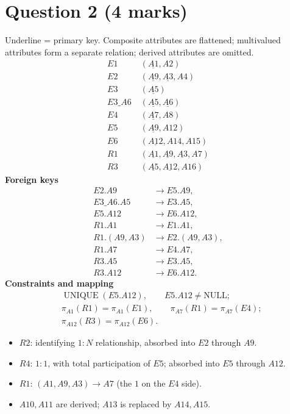 \documentclass[11pt,a4paper]{article}
\newcommand{\pk}[1]{\underline{\mathit{#1}}}
\begin{document}
\section*{Question 2 (4 marks)}
Underline = primary key. Composite attributes are flattened; multivalued
attributes form a separate relation; derived attributes are omitted.
\[
\boxed{\begin{aligned}
E1&\;(\pk{A1},A2)\\[3pt]
E2&\;(\pk{A9},\pk{A3},A4)\\[3pt]
E3&\;(\pk{A5})\\[3pt]
E3\_A6&\;(\pk{A5},\pk{A6})\\[3pt]
E4&\;(\pk{A7},A8)\\[3pt]
E5&\;(\pk{A9},A12)\\[3pt]
E6&\;(\pk{A12},A14,A15)\\[3pt]
R1&\;(\pk{A1},\pk{A9},\pk{A3},A7)\\[3pt]
R3&\;(\pk{A5},\pk{A12},A16)
\end{aligned}}
\]
\textbf{Foreign keys}
\[
\begin{aligned}
E2.A9&\longrightarrow E5.A9,\\
E3\_A6.A5&\longrightarrow E3.A5,\\
E5.A12&\longrightarrow E6.A12,\\
R1.A1&\longrightarrow E1.A1,\\
R1.(A9,A3)&\longrightarrow E2.(A9,A3),\\
R1.A7&\longrightarrow E4.A7,\\
R3.A5&\longrightarrow E3.A5,\\
R3.A12&\longrightarrow E6.A12.
\end{aligned}
\]
\textbf{Constraints and mapping}
\[
\begin{aligned}
&\operatorname{UNIQUE}(E5.A12),\qquad E5.A12\ne\mathrm{NULL};\\
&\pi_{A1}(R1)=\pi_{A1}(E1),\qquad
 \pi_{A7}(R1)=\pi_{A7}(E4);\\
&\pi_{A12}(R3)=\pi_{A12}(E6).
\end{aligned}
\]
\begin{itemize}[leftmargin=*,itemsep=3pt]
\item $R2$: identifying $1:N$ relationship, absorbed into $E2$ through $A9$.
\item $R4$: $1:1$, with total participation of $E5$; absorbed into $E5$ through $A12$.
\item $R1$: $(A1,A9,A3)\to A7$ (the $1$ on the $E4$ side).
\item $A10,A11$ are derived; $A13$ is replaced by $A14,A15$.
\end{itemize}
\newpage
\end{document}

